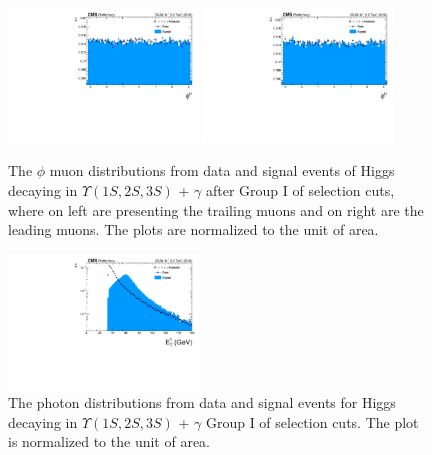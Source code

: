 \begin{figure}[!htbp]
\begin{center}
\includegraphics[width=0.45\textwidth]{figures/outputPlots/HtoUpsilon_Cat0_ZZZZZ/au/data_x_mc/noKinCuts/h_noKin_TrailingMu_phi}\hspace*{1.cm}
\includegraphics[width=0.45\textwidth]{figures/outputPlots/HtoUpsilon_Cat0_ZZZZZ/au/data_x_mc/noKinCuts/h_noKin_LeadingMu_phi}
\end{center}\vspace*{-.5cm}
\caption{The $\phi$ muon distributions from data and signal events of Higgs decaying in $\Upsilon(1S,2S,3S)$ + $\gamma$ after Group I of selection cuts, where on left are presenting the trailing muons and on right are the leading muons. The plots are normalized to the unit of area.}
\label{fig:phiMuons_HtoUpsilon_Cat0}
\end{figure}


\begin{figure}[!htbp]
\begin{center}
\includegraphics[width=0.45\textwidth]{figures/outputPlots/HtoUpsilon_Cat0_ZZZZZ/au/data_x_mc/noKinCuts/h_noKin_Photon_pt}\hspace*{1.cm}
\end{center}\vspace*{-.5cm}
\caption{The \PT photon distributions from data and signal events for Higgs decaying in $\Upsilon(1S,2S,3S)$ + $\gamma$ Group I of selection cuts. The plot is normalized to the unit of area.}
\label{fig:pTPhoton_HtoUpsilon_Cat0}
\end{figure}


